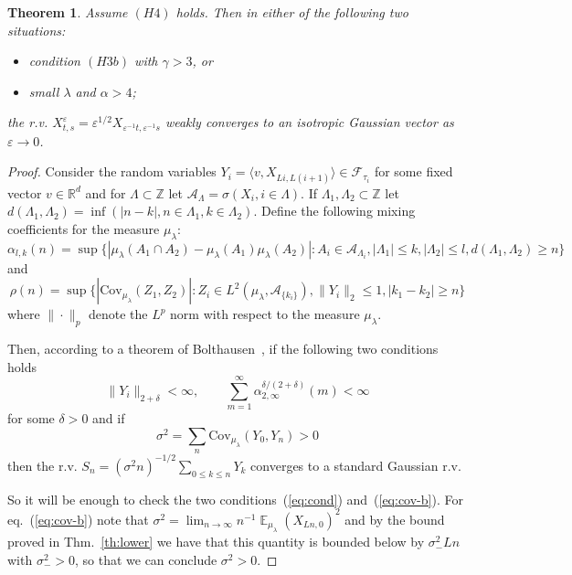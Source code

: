 \documentclass[a4paper,12pt,reqno]{amsart}
\newtheorem{theorem}{Theorem}
\DeclareMathOperator{\expect}{{\mathbb E}}
\newcommand{\eps}{\varepsilon}
\newcommand{\R}{\mathbb{R}}
\newcommand{\Z}{\mathbb{Z}}
\newcommand{\A}{\mathcal{A}}
\newcommand{\F}{\mathcal{F}}
\begin{document}
\begin{theorem} Assume $(H4)$ holds. Then in either of the following two situations:
  \begin{itemize}
\item[(a)] condition $(H3b)$ with $\gamma > 3$, or
  \item[(b)]  small $\lambda$ and $\alpha >
  4$;
  \end{itemize}
 the r.v. $X^{\eps}_{t,s} = \eps^{1/2} X_{\eps^{-1}t,\eps^{-1}s}$ weakly
converges to an isotropic
Gaussian vector as $\eps \to 0$.   
\end{theorem}

\begin{proof}
Consider the random variables $Y_i = \langle v, X_{Li,L(i+1)}\rangle
\in \F_{\tau_i}$ for some fixed vector $v \in \R^d$
and for $\Lambda \subset \Z$ let $\A_\Lambda = \sigma(X_i, i \in
\Lambda)$. 
If $\Lambda_1, \Lambda_2 \subset \Z$ let
$d(\Lambda_1,\Lambda_2) = \inf( |n-k|, n \in \Lambda_1, k \in
\Lambda_2)$. Define the following mixing coefficients for the measure
$\mu_\lambda$:
\begin{equation*}
\alpha_{l,k}(n) = \sup\{|\mu_\lambda(A_1 \cap A_2) -\mu_\lambda(A_1)
\mu_\lambda(A_2)| : A_i \in \A_{\Lambda_{i}}, |\Lambda_1| \le k,
|\Lambda_2| \le l, d(\Lambda_1,\Lambda_2) \ge n\}
\end{equation*}
and
\begin{equation*}
\rho(n) = \sup\{|\mathrm{Cov}_{\mu_\lambda}(Z_1,Z_2)| : Z_i \in
L^2(\mu_\lambda,\A_{\{k_i\}}), \|Y_i\|_2 \le 1, |k_1-k_2| \ge n\}  
\end{equation*}
where $\|\cdot\|_p$ denote the $L^p$ norm with respect to the measure
$\mu_\lambda$.

Then, according to a theorem of Bolthausen~\cite{Bolth}, if the
following two conditions holds
\begin{equation}
  \label{eq:cond}
\|Y_i\|_{2+\delta} < \infty, \qquad
\sum_{m=1}^\infty \alpha_{2,\infty}^{\delta/(2+\delta)}(m) < \infty  
\end{equation}
for some $\delta > 0$ and if
\begin{equation}
  \label{eq:cov-b}
\sigma^2 = \sum_{n} \mathrm{Cov}_{\mu_\lambda}(Y_0, Y_n) > 0 
\end{equation}
then the r.v. $S_{n} = (\sigma^2 n)^{-1/2}\sum_{0 \le k
\le n} Y_k$ converges to a standard Gaussian r.v. 

So it will be enough to check the two conditions~(\ref{eq:cond})
and~(\ref{eq:cov-b}). 
For eq.~(\ref{eq:cov-b}) note that
$
\sigma^2  = \lim_{n \to \infty} n^{-1}\expect_{\mu_\lambda} (X_{Ln,0})^2 
$
and by the bound proved in Thm.~\ref{th:lower} we have that this
quantity is bounded below by $\sigma^2_- Ln$ with $\sigma^2_- > 0$, so that we can conclude
$\sigma^2 > 0$.


\end{proof}
\end{document}
